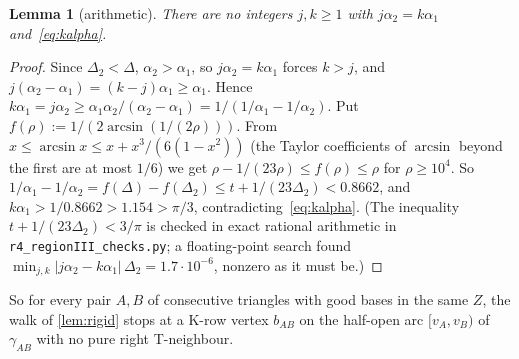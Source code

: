 \documentclass[11pt]{amsart}
\newtheorem{lemma}[theorem]{Lemma}
\theoremstyle{definition}
\theoremstyle{remark}
\newcommand{\Dt}{\Delta_2}
\begin{document}
\begin{lemma}[arithmetic]\label{lem:arith}
There are no integers $j,k\ge1$ with $j\alpha_2=k\alpha_1$ and~\eqref{eq:kalpha}.
\end{lemma}
\begin{proof}
Since $\Dt<\Delta$, $\alpha_2>\alpha_1$, so $j\alpha_2=k\alpha_1$ forces $k>j$, and $j(\alpha_2-\alpha_1)=(k-j)\alpha_1\ge\alpha_1$. Hence $k\alpha_1=j\alpha_2\ge\alpha_1\alpha_2/(\alpha_2-\alpha_1)=1/(1/\alpha_1-1/\alpha_2)$. Put $f(\rho):=1/(2\arcsin(1/(2\rho)))$. From $x\le\arcsin x\le x+x^3/(6(1-x^2))$ (the Taylor coefficients of $\arcsin$ beyond the first are at most $1/6$) we get $\rho-1/(23\rho)\le f(\rho)\le\rho$ for $\rho\ge10^4$. So $1/\alpha_1-1/\alpha_2=f(\Delta)-f(\Dt)\le t+1/(23\Dt)<0.8662$, and $k\alpha_1>1/0.8662>1.154>\pi/3$, contradicting~\eqref{eq:kalpha}. (The inequality $t+1/(23\Dt)<3/\pi$ is checked in exact rational arithmetic in \texttt{r4\_regionIII\_checks.py}; a floating-point search found $\min_{j,k}|j\alpha_2-k\alpha_1|\,\Dt=1.7\cdot10^{-6}$, nonzero as it must be.)
\end{proof}

So for every pair $A,B$ of consecutive triangles with good bases in the same $Z$, the walk of \cref{lem:rigid} stops at a K-row vertex $b_{AB}$ on the half-open arc $[v_A,v_B)$ of $\gamma_{AB}$ with no pure right T-neighbour.
\end{document}
